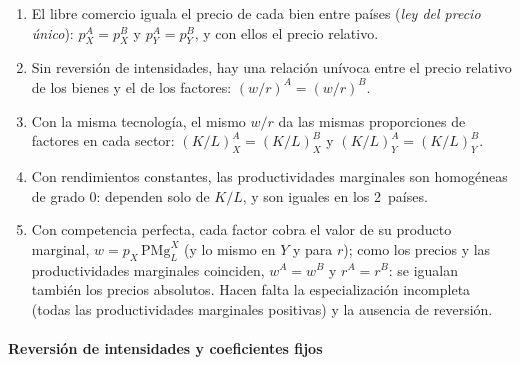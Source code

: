 \documentclass[11pt]{article}
\begin{document}
\begin{enumerate}
\item El libre comercio iguala el precio de cada bien entre países (\emph{ley del precio único}): $p_X^A=p_X^B$ y $p_Y^A=p_Y^B$, y con ellos el precio relativo.
\item Sin reversión de intensidades, hay una relación unívoca entre el precio relativo de los bienes y el de los factores: $(w/r)^A=(w/r)^B$.
\item Con la misma tecnología, el mismo $w/r$ da las mismas proporciones de factores en cada sector: $(K/L)_X^A=(K/L)_X^B$ y $(K/L)_Y^A=(K/L)_Y^B$.
\item Con rendimientos constantes, las productividades marginales son homogéneas de grado 0: dependen solo de $K/L$, y son iguales en los 2~países.
\item Con competencia perfecta, cada factor cobra el valor de su producto marginal, $w=p_X\,\mathrm{PMg}_L^X$ (y lo mismo en $Y$ y para $r$); como los precios y las productividades marginales coinciden, $w^A=w^B$ y $r^A=r^B$: se igualan también los precios absolutos. Hacen falta la especialización incompleta (todas las productividades marginales positivas) y la ausencia de reversión.\findemo
\end{enumerate}


\paragraph{Reversión de intensidades y coeficientes fijos}
\end{document}
